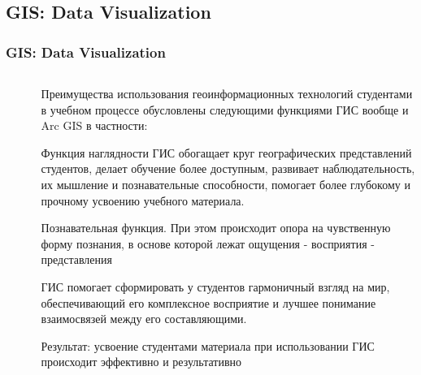 \documentclass[pdflatex,compress,8pt,
	xcolor={dvipsnames,dvipsnames,svgnames,x11names,table},
	hyperref={	 
	pdfauthor={Lemenkova Polina}, 
	pdfsubject={Preentation}, 
	pdfcreator={Lemenkova Polina}, 
	pdfproducer={Lemenkova Polina}, 
	colorlinks=true,
	linkcolor=Red3, 
	citecolor=NavyBlue, 
	urlcolor = NavyBlue, 
	breaklinks = true}]{beamer}
\begin{document}
\subsection{GIS: Data Visualization}
\begin{frame}\frametitle{GIS: Data Visualization}

	\begin{minipage}[0.4\textheight]{\textwidth}
		\begin{columns}[T]
			\begin{column}{0.3\textwidth}
				\begin{figure}[H]
					\centering
						\hspace{1mm}
				\end{figure}
			\end{column}
			\begin{column}{0.7\textwidth}	
				\small{
				\begin{alertblock}{}
Преимущества использования геоинформационных технологий студентами в учебном процессе обусловлены следующими функциями ГИС вообще и Arc GIS в частности:
				\end{alertblock}

				\begin{block}{}
Функция наглядности ГИС обогащает круг географических представлений студентов, делает обучение более доступным,  развивает наблюдательность, их мышление и познавательные способности, помогает более глубокому и прочному усвоению учебного материала.  
				\end{block}
				
				\begin{alertblock}{}
Познавательная функция. При этом происходит опора на чувственную форму познания, в основе которой лежат ощущения - восприятия - представления
				\end{alertblock}
				
				\begin{block}{}
ГИС помогает сформировать у студентов гармоничный взгляд на мир, обеспечивающий его комплексное восприятие и лучшее понимание взаимосвязей между его составляющими.
				\end{block}

				\begin{block}{}
Результат: усвоение студентами материала при использовании ГИС происходит эффективно и результативно
				\end{block}
				}
			\end{column}
		\end{columns}
	\end{minipage}

\end{frame}
\end{document}
